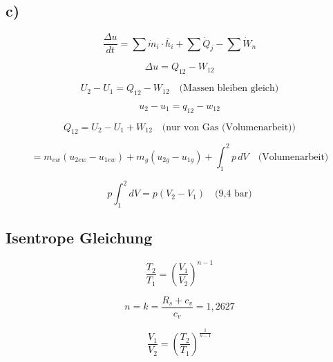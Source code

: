 

\subsection*{c)}

\begin{equation*}
\frac{\Delta u}{dt} = \sum \dot{m}_i \cdot \overline{h}_i + \sum \dot{Q}_j - \sum \dot{W}_n
\end{equation*}

\begin{equation*}
\Delta u = Q_{12} - W_{12}
\end{equation*}

\begin{equation*}
U_2 - U_1 = Q_{12} - W_{12} \quad \text{(Massen bleiben gleich)}
\end{equation*}

\begin{equation*}
u_2 - u_1 = q_{12} - w_{12}
\end{equation*}

\begin{equation*}
Q_{12} = U_2 - U_1 + W_{12} \quad \text{(nur von Gas (Volumenarbeit))}
\end{equation*}

\begin{equation*}
= m_{ew} (u_{2ew} - u_{1ew}) + m_g (u_{2g} - u_{1g}) + \int_1^2 p \, dV \quad \text{(Volumenarbeit)}
\end{equation*}

\begin{equation*}
p \int_1^2 dV = p (V_2 - V_1) \quad \text{(9,4 bar)}
\end{equation*}

\subsection*{Isentrope Gleichung}

\begin{equation*}
\frac{T_2}{T_1} = \left( \frac{V_1}{V_2} \right)^{n-1}
\end{equation*}

\begin{equation*}
n = k = \frac{R_s + c_v}{c_v} = 1,2627
\end{equation*}

\begin{equation*}
\frac{V_1}{V_2} = \left( \frac{T_2}{T_1} \right)^{\frac{1}{n-1}}
\end{equation*}

